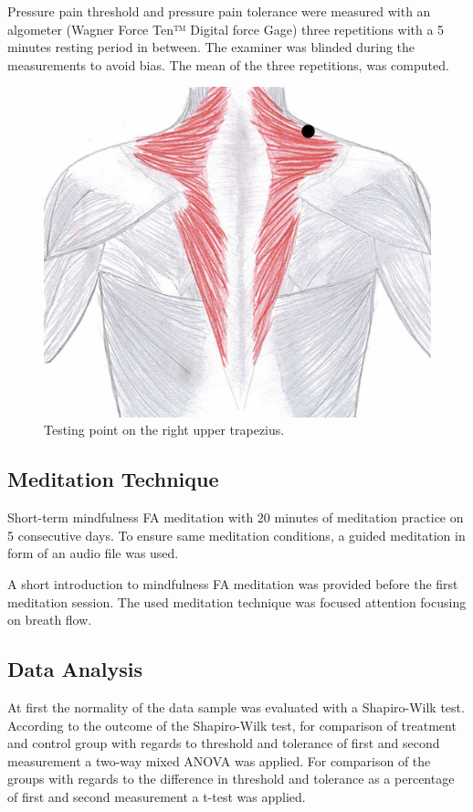 Pressure pain threshold and pressure pain tolerance were measured with an algometer (Wagner Force Ten™ Digital force Gage) three repetitions with a 5 minutes resting period in between. The examiner was blinded during the measurements to avoid bias. The mean of the three repetitions, was computed. 

\begin{figure}[H]
\centering
\includegraphics[width=.7\columnwidth]{../figures/trapezius}
\caption{Testing point on the right upper trapezius.}
\label{fig:trapezius}
\end{figure} \vspace{-.5cm}


\subsection{Meditation Technique}
Short-term mindfulness FA meditation with 20 minutes of meditation practice on 5 consecutive days. To ensure same meditation conditions, a guided meditation in form of an audio file was used. 

A short introduction to mindfulness FA meditation was provided before the first meditation session. The used meditation technique was focused attention focusing on breath flow.

\subsection{Data Analysis}
At first the normality of the data sample was evaluated with a Shapiro-Wilk test. According to the outcome of the Shapiro-Wilk test, for comparison of treatment and control group with regards to threshold and tolerance of first and second measurement a two-way mixed ANOVA was applied. For comparison of the groups with regards to the difference in threshold and tolerance as a percentage of first and second measurement a t-test was applied.


